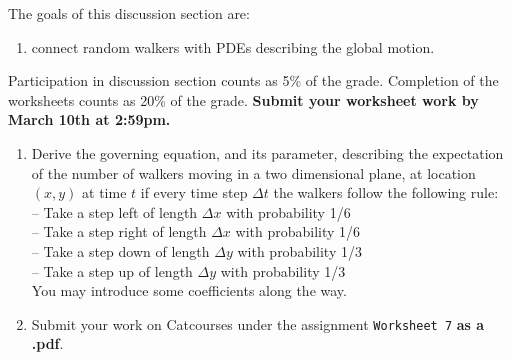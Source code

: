 \documentclass[11pt]{article}
\begin{document}
The goals of this discussion section are: 

\begin{enumerate}
\item connect random walkers with PDEs describing the global motion.
\end{enumerate}

Participation in discussion section counts as 5\% of the grade. Completion of the worksheets counts as 20\% of the grade. \textbf{Submit your worksheet work by March 10th at 2:59pm.}

\begin{enumerate}
\item Derive the governing equation, and its parameter, describing the expectation of the number of walkers moving in a two dimensional plane, at location $(x,y)$ at time $t$ if every time step $\Delta t$ the walkers follow the following rule:\\
	-- Take a step left of length $\Delta x $ with probability 1/6 \\
	-- Take a step right of length $\Delta x $ with probability 1/6 \\
	-- Take a step down of length $ \Delta y$ with probability 1/3 \\
	-- Take a step up of length $ \Delta y$ with probability 1/3 \\
You may introduce some coefficients along the way.
\item Submit your work on Catcourses under the assignment \texttt{Worksheet 7} \textbf{as a .pdf}. 
\end{enumerate}
\end{document}
